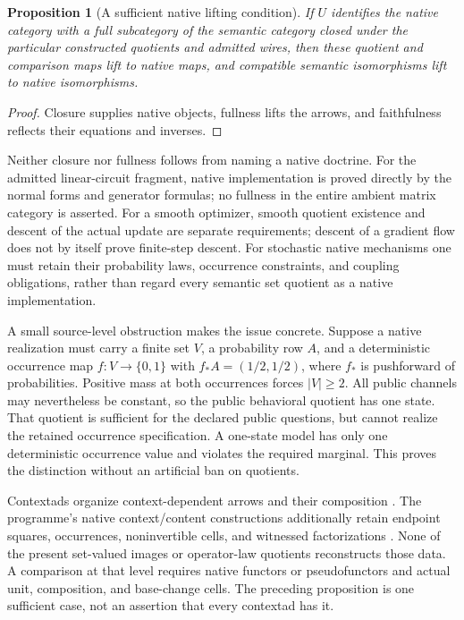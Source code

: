 \documentclass[11pt]{article}
\newtheorem{proposition}[theorem]{Proposition}
\theoremstyle{definition}
\theoremstyle{remark}\newtheorem{remark}[theorem]{Remark}
\begin{document}
\begin{proposition}[A sufficient native lifting condition]
If $U$ identifies the native category with a full subcategory of the
semantic category closed under the particular constructed quotients and
admitted wires, then these quotient and comparison maps lift to native
maps, and compatible semantic isomorphisms lift to native isomorphisms.
\end{proposition}
\begin{proof}
Closure supplies native objects, fullness lifts the arrows, and faithfulness
reflects their equations and inverses.
\end{proof}
Neither closure nor fullness follows from naming a native doctrine.
For the admitted linear-circuit fragment, native implementation is proved
directly by the normal forms and generator formulas; no fullness in the
entire ambient matrix category is asserted. For a smooth optimizer, smooth quotient
existence and descent of the actual update are separate requirements;
descent of a gradient flow does not by itself prove finite-step descent.
For stochastic native mechanisms one must retain their probability laws,
occurrence constraints, and coupling obligations, rather than regard every
semantic set quotient as a native implementation.

A small source-level obstruction makes the issue concrete. Suppose a native
realization must carry a finite set $V$, a probability row $A$, and a
deterministic occurrence map $f:V\to\{0,1\}$ with
$f_*A=(1/2,1/2)$, where $f_*$ is pushforward of probabilities. Positive mass at both occurrences forces $|V|\ge2$.
All public channels may nevertheless be constant, so the public behavioral
quotient has one state. That quotient is sufficient for the declared public
questions, but cannot realize the retained occurrence specification.
A one-state model has only one deterministic occurrence value and violates
the required marginal. This proves the distinction without an artificial
ban on quotients.

Contextads organize context-dependent arrows and their composition
\cite{contextads}. The programme's native context/content constructions
additionally retain endpoint squares, occurrences, noninvertible cells, and
witnessed factorizations \cite{contextual-note}. None of the present
set-valued images or operator-law quotients reconstructs those data. A
comparison at that level requires native functors or pseudofunctors and
actual unit, composition, and base-change cells. The preceding proposition
is one sufficient case, not an assertion that every contextad has it.
\end{document}
